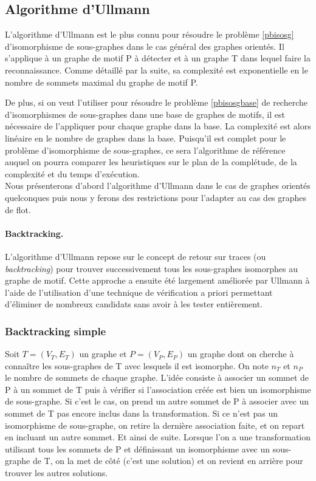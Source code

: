 \subsection{Algorithme d'Ullmann}
L'algorithme d'Ullmann est le plus connu pour résoudre le problème \ref{pbisosg} d'isomorphisme de sous-graphes \cite{Ull76} dans le cas général des graphes orientés. Il s'applique à un graphe de motif P à détecter et à un graphe T dans lequel faire la reconnaissance. Comme détaillé par la suite, sa complexité est exponentielle en le nombre de sommets maximal du graphe de motif P.

De plus, si on veut l'utiliser pour résoudre le problème \ref{pbisosgbase} de recherche d'isomorphismes de sous-graphes dans une base de graphes de motifs, il est nécessaire de l'appliquer pour chaque graphe dans la base. La complexité est alors linéaire en le nombre de graphes dans la base.
Puisqu'il est complet pour le problème d'isomorphisme de sous-graphes, ce sera l'algorithme de référence auquel on pourra comparer les heuristiques sur le plan de la complétude, de la complexité et du temps d'exécution.\\

Nous présenterons d'abord l'algorithme d'Ullmann dans le cas de graphes orientés quelconques puis nous y ferons des restrictions pour l'adapter au cas des graphes de flot.

\paragraph{Backtracking.}
L'algorithme d'Ullmann repose sur le concept de retour sur traces (ou \emph{backtracking}) pour trouver successivement tous les sous-graphes isomorphes au graphe de motif. 
Cette approche a ensuite été largement améliorée par Ullmann à l'aide de l'utilisation d'une technique de vérification a priori permettant d'éliminer de nombreux candidats sans avoir à les tester entièrement.

\subsubsection{Backtracking simple}
Soit $T=(V_T, E_T)$ un graphe et $P=(V_P, E_P)$ un graphe dont on cherche à connaître les sous-graphes de T avec lesquels il est isomorphe.
On note $n_T$ et $n_P$ le nombre de sommets de chaque graphe.
L'idée consiste à associer un sommet de P à un sommet de T puis à vérifier si l'association créée est bien un
isomorphisme de sous-graphe. 
Si c'est le cas, on prend un autre sommet de P à associer avec un sommet de T pas encore
inclus dans la transformation. 
Si ce n'est pas un isomorphisme de sous-graphe, on retire la dernière association faite, et on repart en incluant un autre sommet. 
Et ainsi de suite. Lorsque l'on a une transformation utilisant tous les sommets de P et définissant un isomorphisme avec un sous-graphe de T, on la met de côté (c'est une solution) et on revient en arrière pour trouver les autres solutions.



